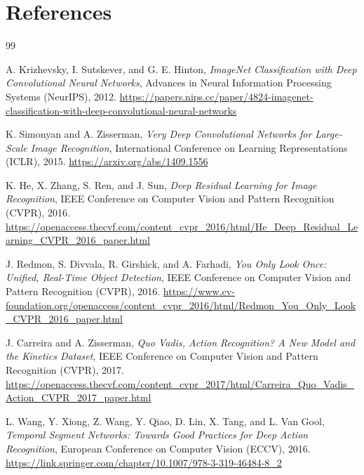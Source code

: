 \documentclass[11pt,a4paper]{article}
\begin{document}
\section{References}
\begin{thebibliography}{99}

A. Krizhevsky, I. Sutskever, and G. E. Hinton, \emph{ImageNet Classification with Deep Convolutional Neural Networks}, Advances in Neural Information Processing Systems (NeurIPS), 2012. \url{https://papers.nips.cc/paper/4824-imagenet-classification-with-deep-convolutional-neural-networks}

K. Simonyan and A. Zisserman, \emph{Very Deep Convolutional Networks for Large-Scale Image Recognition}, International Conference on Learning Representations (ICLR), 2015. \url{https://arxiv.org/abs/1409.1556}

K. He, X. Zhang, S. Ren, and J. Sun, \emph{Deep Residual Learning for Image Recognition}, IEEE Conference on Computer Vision and Pattern Recognition (CVPR), 2016. \url{https://openaccess.thecvf.com/content_cvpr_2016/html/He_Deep_Residual_Learning_CVPR_2016_paper.html}

J. Redmon, S. Divvala, R. Girshick, and A. Farhadi, \emph{You Only Look Once: Unified, Real-Time Object Detection}, IEEE Conference on Computer Vision and Pattern Recognition (CVPR), 2016. \url{https://www.cv-foundation.org/openaccess/content_cvpr_2016/html/Redmon_You_Only_Look_CVPR_2016_paper.html}

J. Carreira and A. Zisserman, \emph{Quo Vadis, Action Recognition? A New Model and the Kinetics Dataset}, IEEE Conference on Computer Vision and Pattern Recognition (CVPR), 2017. \url{https://openaccess.thecvf.com/content_cvpr_2017/html/Carreira_Quo_Vadis_Action_CVPR_2017_paper.html}

L. Wang, Y. Xiong, Z. Wang, Y. Qiao, D. Lin, X. Tang, and L. Van Gool, \emph{Temporal Segment Networks: Towards Good Practices for Deep Action Recognition}, European Conference on Computer Vision (ECCV), 2016. \url{https://link.springer.com/chapter/10.1007/978-3-319-46484-8_2}

\end{thebibliography}
\end{document}
